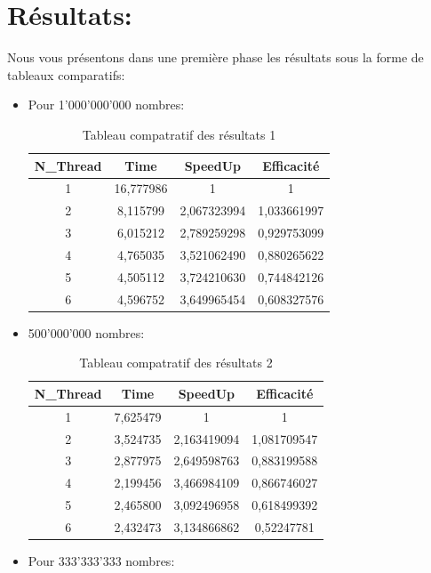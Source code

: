 \documentclass{report}
\begin{document}
\section{Résultats:}
Nous vous présentons dans une première phase les résultats sous la forme de tableaux
comparatifs:
\begin{itemize}
	\item Pour 1'000'000'000 nombres:\\
	\begin{table}[H]
			\center
			\begin{tabular}{|c|c|c|c|}
				\hline
				N\_Thread	&	Time	& SpeedUp	& Efficacité \\
				\hline
				1	&	16,777986	& 1	&	1	\\
				\hline
				2	&	8,115799	& 2,067323994	&	1,033661997	\\
				\hline
				3	&	6,015212	& 2,789259298		&	0,929753099	\\
				\hline
				4	&	4,765035	& 3,521062490	&	0,880265622	\\
				\hline
				5	&	4,505112	& 3,724210630	&	0,744842126	\\
				\hline
				6	&	4,596752	& 3,649965454	&	0,608327576	\\
				\hline
			\end{tabular}
		\caption{Tableau compatratif des résultats 1}
	\end{table}
	\item 500'000'000 nombres:\\
	\begin{table}[H]
			\center
			\begin{tabular}{|c|c|c|c|}
				\hline
				N\_Thread	&	Time	& SpeedUp	& Efficacité \\
				\hline
				1	&	7,625479	& 1	&	1	\\
				\hline
				2	&	3,524735	& 2,163419094		&	1,081709547	\\
				\hline
				3	&	2,877975	& 2,649598763		&	0,883199588	\\
				\hline
				4	&	2,199456	& 3,466984109	&	0,866746027	\\
				\hline
				5	&	2,465800	& 3,092496958	&	0,618499392	\\
				\hline
				6	&	2,432473	& 3,134866862	&	0,52247781	\\
				\hline
			\end{tabular}
		\caption{Tableau compatratif des résultats 2}
	\end{table}
	\item Pour 333'333'333 nombres:\\

\end{itemize}
\end{document}
